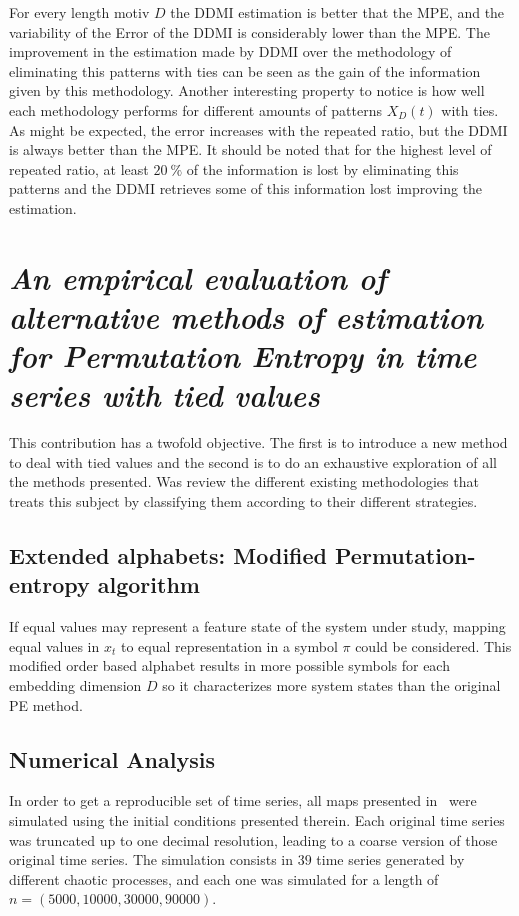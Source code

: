 \documentclass[11pt]{article}
\begin{document}
For every length motiv $D$ the DDMI estimation is better that the MPE, and the variability of the Error of the DDMI is considerably lower than the MPE. 
The improvement in the estimation made by DDMI over the methodology of eliminating this patterns with ties can be seen as the gain of the information given by this methodology.
Another interesting property to notice is how well each methodology performs for different amounts of patterns $X_D(t)$ with ties.
As might be expected, the error increases with the repeated ratio, but the DDMI is always better than the MPE. 
It should be noted that for the highest level of repeated ratio, at least $\SI{20}{\percent}$ of the information is lost by eliminating this patterns and the DDMI retrieves some of this information lost improving the estimation.
\newpage

\section*{\textbf{\textit{An empirical evaluation of alternative methods of estimation for Permutation Entropy in time series with tied values}}~\cite{traversaro2017empirical}}

This contribution has a twofold objective. 
The first is to introduce a new method to deal with tied values and the second is to do an exhaustive exploration of all the methods presented.
Was review the different existing methodologies that treats this subject by classifying them according to their different strategies.

\subsection*{Extended alphabets: Modified Permutation-entropy algorithm}

If equal values may represent a feature state of the system under study, mapping equal values in {$x_t$} to equal representation in a symbol $\pi$ could be considered.
This modified order based alphabet results in more possible symbols for each embedding dimension $D$ so it characterizes more system states than the original PE method.

\subsection*{Numerical Analysis}

In order to get a reproducible set of time series, all maps presented in~ were simulated using the initial conditions presented therein.
Each original time series was truncated up to one decimal resolution, leading to a coarse version of those original time series.
The simulation consists in $39$ time series generated by different chaotic processes, and each one was simulated for a length of $n = (5000, 10000, 30000, 90000)$.
\end{document}
